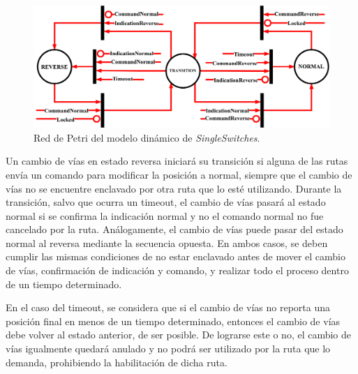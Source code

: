 	\begin{figure}[H]
		\centering
		\includegraphics[width=1\textwidth]{Figuras/SSW_Petri}
		\centering\caption{Red de Petri del modelo dinámico de \textit{SingleSwitches}.}
		\label{fig:SSW_Petri}
	\end{figure}
	
	Un cambio de vías en estado reversa iniciará su transición si alguna de las rutas envía un comando para modificar la posición a normal, siempre que el cambio de vías no se encuentre enclavado por otra ruta que lo esté utilizando. Durante la transición, salvo que ocurra un timeout, el cambio de vías pasará al estado normal si se confirma la indicación normal y no el comando normal no fue cancelado por la ruta. Análogamente, el cambio de vías puede pasar del estado normal al reversa mediante la secuencia opuesta. En ambos casos, se deben cumplir las mismas condiciones de no estar enclavado antes de mover el cambio de vías, confirmación de indicación y comando, y realizar todo el proceso dentro de un tiempo determinado.
	
	En el caso del timeout, se considera que si el cambio de vías no reporta una posición final en menos de un tiempo determinado, entonces el cambio de vías debe volver al estado anterior, de ser posible. De lograrse este o no, el cambio de vías igualmente quedará anulado y no podrá ser utilizado por la ruta que lo demanda, prohibiendo la habilitación de dicha ruta.
